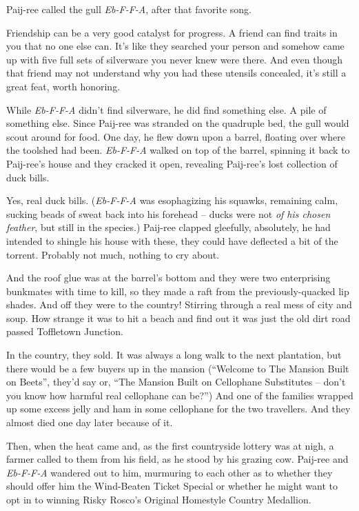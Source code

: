 \documentclass[12pt,twoside]{report}
\begin{document}
Paij-ree called the gull {\em Eb-F-F-A}, after that favorite song.

Friendship can be a very good catalyst for progress.  A friend can
find traits in you that no one else can.  It's like they searched your
person and somehow came up with five full sets of silverware you never
knew were there.  And even though that friend may not understand why
you had these utensils concealed, it's still a great feat, worth
honoring.

While {\em Eb-F-F-A} didn't find silverware, he did find something
else.  A pile of something else.  Since Paij-ree was stranded on the
quadruple bed, the gull would scout around for food.  One day, he flew
down upon a barrel, floating over where the toolshed had been.  {\em
  Eb-F-F-A} walked on top of the barrel, spinning it back to
Paij-ree's house and they cracked it open, revealing Paij-ree's lost
collection of duck bills.

Yes, real duck bills. ({\em Eb-F-F-A} was esophagizing his squawks,
remaining calm, sucking beads of sweat back into his forehead -- ducks
were not {\em of his chosen feather}, but still in the species.)
Paij-ree clapped gleefully, absolutely, he had intended to shingle his
house with these, they could have deflected a bit of the
torrent. Probably not much, nothing to cry about.

And the roof glue was at the barrel's bottom and they were two
enterprising bunkmates with time to kill, so they made a raft from the
previously-quacked lip shades.  And off they were to the country!
Stirring through a real mess of city and soup.  How strange it was to
hit a beach and find out it was just the old dirt road passed
Toffletown Junction.

In the country, they sold.  It was always a long walk to the next
plantation, but there would be a few buyers up in the mansion
(``Welcome to The Mansion Built on Beets'', they'd say or, ``The
Mansion Built on Cellophane Substitutes -- don't you know how harmful
real cellophane can be?'')  And one of the families wrapped up some
excess jelly and ham in some cellophane for the two travellers.  And
they almost died one day later because of it.

Then, when the heat came and, as the first countryside lottery was at
nigh, a farmer called to them from his field, as he stood by his
grazing cow. Paij-ree and {\em Eb-F-F-A} wandered out to him,
murmuring to each other as to whether they should offer him the
Wind-Beaten Ticket Special or whether he might want to opt in to
winning Risky Rosco's Original Homestyle Country Medallion.
\end{document}
